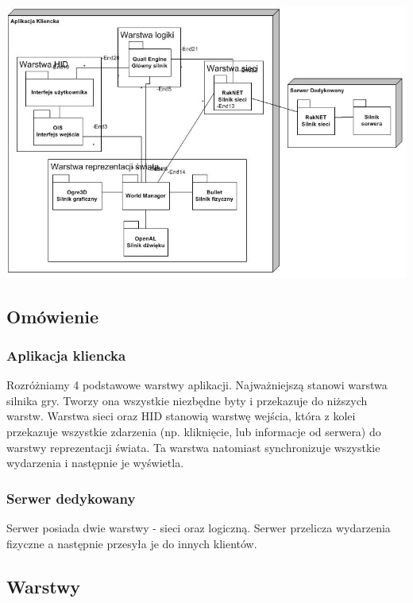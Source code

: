 \documentclass[12pt,a4paper,twoside]{article}
\begin{document}
\includegraphics[angle=90]{pics/ModuleCommunication.jpg}

\subsection{Omówienie}


\subsubsection{Aplikacja kliencka}

Rozróżniamy 4 podstawowe warstwy aplikacji. Najważniejszą stanowi warstwa silnika gry. Tworzy ona wszystkie niezbędne byty i przekazuje do niższych warstw. Warstwa sieci oraz HID stanowią warstwę wejścia, która z kolei przekazuje wszystkie zdarzenia (np. kliknięcie, lub informacje od serwera) do warstwy reprezentacji świata. Ta warstwa natomiast synchronizuje wszystkie wydarzenia i następnie je wyświetla.
\subsubsection{Serwer dedykowany}
Serwer posiada dwie warstwy - sieci oraz logiczną. Serwer przelicza wydarzenia fizyczne a następnie przesyła je do innych klientów.

\subsection{Warstwy}
\end{document}

